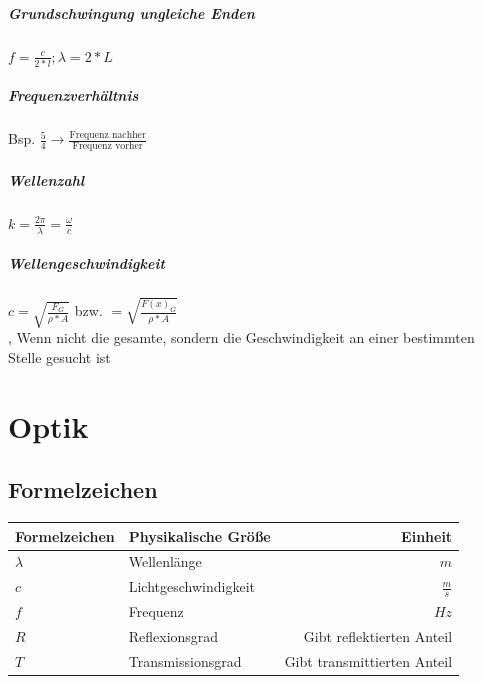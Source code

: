 \documentclass[12pt, a4paper]{scrreprt}
\begin{document}
\paragraph{Grundschwingung ungleiche Enden} \dotfill \(f = \frac{c}{2*l} ; \lambda = 2 * L\)
\paragraph{Frequenzverhältnis} \dotfill Bsp. \(\frac{5}{4} \rightarrow \frac{\text{Frequenz nachher}}{\text{Frequenz vorher}}\)
\paragraph{Wellenzahl} \dotfill \(k = \frac{2\pi}{\lambda} = \frac{\omega}{c}\)
\paragraph{Wellengeschwindigkeit} \dotfill \(c = \sqrt{\frac{F_G}{\rho * A}}\) bzw. \(= \sqrt{\frac{F(x)_G}{\rho * A}}\)\\ , Wenn nicht die gesamte, sondern die Geschwindigkeit an einer bestimmten Stelle gesucht ist



\chapter{Optik}

\section{Formelzeichen}

\begin{center}
  \makegapedcells
  \begin{tabular}{l | l | r}
    Formelzeichen & Physikalische Größe & Einheit\\
    \hline \hline
    \(\lambda\) & Wellenlänge & \(m\)\\ \hline
    \(c\) & Lichtgeschwindigkeit & \(\frac{m}{s}\)\\ \hline
    \(f\) & Frequenz & \(Hz\)\\ \hline
    \(R\) & Reflexionsgrad & Gibt reflektierten Anteil\\ \hline
    \(T\) & Transmissionsgrad & Gibt transmittierten Anteil\\ \hline
  \end{tabular}
\end{center}
\end{document}
